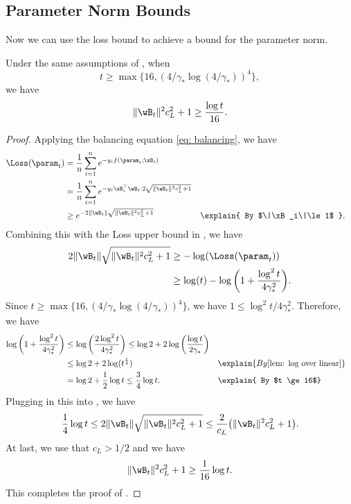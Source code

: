 \subsection{Parameter Norm Bounds} \label{sec:proof:eg-parameter}
Now we can use the loss bound to achieve a bound for the parameter norm. 

\begin{lemma}
\label{lem: Parameter norm bound}
Under the same assumptions of , when \[t \ge \max \{ 16 , ( 4/ \gamma_* \log (4 / \gamma_* ))^4  \},\] we have  
\begin{equation}
\label{eq: parameter norm bound}
    \|\wB_t\|^2 c_L^2 + 1 \ge \frac{ \log t}{16}. 
\end{equation}
\end{lemma}
\begin{proof}
Applying the balancing equation \cref{eq: balancing}, we have 
\begin{align*}
    \Loss (\param_t) 
    &= \frac{1}{n} \sum_{i=1}^n e^{-y_i f(\param_t;\xB_i)} \\ 
    &= \frac{1}{n} \sum_{i=1}^n e^{-y_i \xB_i^\top  \wB_t \cdot 2 \sqrt{\|\wB_t\|^2 c_L^2 +1} } \\ 
    &\ge e^{- 2 \|\wB_t\| \sqrt{\|\wB_t\|^2 c_L^2 +1} } &&\explain{ By $\|\xB_i\|\le 1$ }. 
\end{align*}
Combining this with the Loss upper bound in , we have
\begin{align}
    \label{eq: log mess}
    2 \|\wB_t\| \sqrt{\|\wB_t\|^2 c_L^2 +1} &\ge  - \log (\Loss (\param_t) ) \notag\\ 
    &\ge  \log (t) - \log \bigg( 1+ \frac{\log^2t}{4 \gamma_*^2} \bigg) .
\end{align}
Since $t \ge \max \{ 16 , ( 4/ \gamma_* \log (4 / \gamma_* ))^4  \}$, we have $1 \le \log^2 t/4 \gamma_*^2$. Therefore, we have 
\begin{align*}
    \log \bigg( 1+ \frac{\log^2t}{4 \gamma_*^2} \bigg) 
    &\le \log \bigg(  \frac{2\log^2t}{4 \gamma_*^2} \bigg) \le \log 2 + 2 \log \bigg(  \frac{\log t}{2 \gamma_*} \bigg) \\ 
    &\le \log2 + 2 \log (t^{\frac{1}{4}}) &&\explain{ By \Cref{lem: log over linear}}\\
    & = \log 2 + \frac{1}{2} \log t \le  \frac{3}{4}\log t. &&\explain{ By $t \ge 16$}
\end{align*}
Plugging in this into , we have 
\[
    \frac{1}{4} \log t \le  2 \|\wB_t\| \sqrt{\|\wB_t\|^2 c_L^2 +1} \le  \frac{2}{c_L} \big(\| \wB_t\|^2 c_L^2 + 1 \big). 
\]
At last, we use that $c_L >1/2 $ and we have 
\[
    \|\wB_t\|^2 c_L^2 + 1 \ge \frac{1}{16} \log t.
\]
This completes the proof of .
\end{proof}

